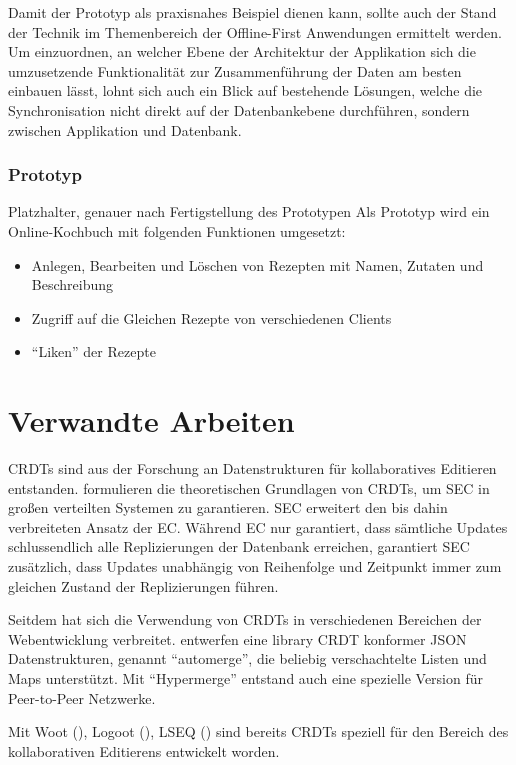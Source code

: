 \documentclass[a4paper, 12pt]{scrreprt}
\newcommand\klammercite[1]{%
	(\citealt{#1})}
\begin{document}
Damit der Prototyp als praxisnahes Beispiel dienen kann, sollte auch der Stand der Technik im Themenbereich der Offline-First Anwendungen ermittelt werden. Um einzuordnen, an welcher Ebene der Architektur der Applikation sich die umzusetzende Funktionalität zur Zusammenführung der Daten am besten einbauen lässt, lohnt sich auch ein Blick auf bestehende Lösungen, welche die Synchronisation nicht direkt auf der Datenbankebene durchführen, sondern zwischen Applikation und Datenbank.

\subsection{Prototyp}
Platzhalter, genauer nach Fertigstellung des Prototypen
Als Prototyp wird ein Online-Kochbuch mit folgenden Funktionen umgesetzt:
\begin{itemize}
	\item Anlegen, Bearbeiten und Löschen von Rezepten mit Namen, Zutaten und Beschreibung
	\item Zugriff auf die Gleichen Rezepte von verschiedenen Clients
	\item \enquote{Liken} der Rezepte
\end{itemize}

\chapter{Verwandte Arbeiten}
CRDTs sind aus der Forschung an Datenstrukturen für kollaboratives Editieren entstanden. \citet{InproceedingsCRDTOriginal} formulieren die theoretischen Grundlagen von CRDTs, um \ac{SEC} in großen verteilten Systemen zu garantieren. \ac{SEC} erweitert den bis dahin verbreiteten Ansatz der \ac{EC}. Während EC nur garantiert, dass sämtliche Updates schlussendlich alle Replizierungen der Datenbank erreichen, garantiert SEC zusätzlich, dass Updates unabhängig von Reihenfolge und Zeitpunkt immer zum gleichen Zustand der Replizierungen führen.

Seitdem hat sich die Verwendung von CRDTs in verschiedenen Bereichen der Webentwicklung verbreitet. \citet{ArticleCRDTJSON} entwerfen eine library CRDT konformer \ac{JSON} Datenstrukturen, genannt \enquote{automerge}, die beliebig verschachtelte Listen und Maps unterstützt. Mit \enquote{Hypermerge} entstand auch eine spezielle Version für Peer-to-Peer Netzwerke.

Mit Woot\klammercite{InproceedingsCRDTWoot}, Logoot\klammercite{InproceedingsCRDTLogoot}, LSEQ\klammercite{InproceedingsCRDTLSEQ} sind bereits CRDTs speziell für den Bereich des kollaborativen Editierens entwickelt worden. 
\end{document}

